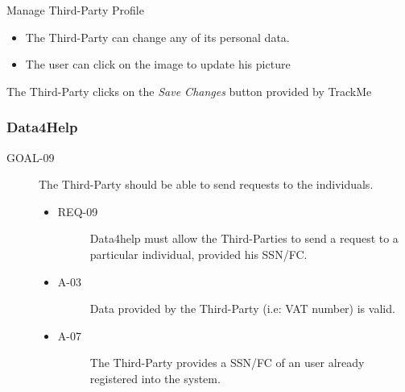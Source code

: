 \documentclass[a4paper]{article}
\newcommand{\requirement}{\ding{229}}%
\begin{document}
       \begin{usecase}{Manage Third-Party Profile}
        {\begin{itemize}
            \item The Third-Party can change any of its personal data.
            \item The user can click on the image to update his picture
        \end{itemize}}
        {The Third-Party clicks on the \textit{Save Changes} button provided by TrackMe}
       \end{usecase}
           
           
        \subsubsection{Data4Help}
      
            \begin{description}
        	\item[GOAL-09] The Third-Party should be able to send requests to the individuals. 
            	\begin{itemize}
            	    \item[\requirement]
                	\begin{description}
                	\item[REQ-09] Data4help must allow the Third-Parties to send a request to a particular individual, provided his SSN/FC. 
                	\end{description}
                	\item
                	\begin{description}
                	\item[A-03] Data provided by the Third-Party (i.e: VAT number) is valid.
                	\end{description}
                	\item
                	\begin{description}
                	\item[A-07] The Third-Party provides a SSN/FC of an user already registered into the system.
                	\end{description}
                	\end{itemize}
        \end{description}
      
\end{document}
